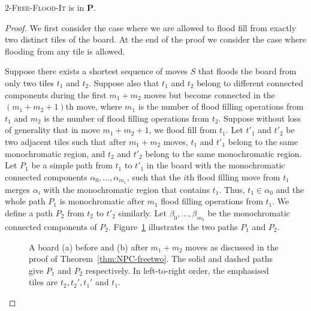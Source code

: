 \documentclass[a4paper,11pt]{llncs}
\newcommand{\pgfgraphic}[1]{}
\newcounter{l}
\newcommand{\Ptime}{\ensuremath{\mathbf{P}}}
\newcommand{\ColoroidFree}[1]{$#1$-\textsc{Free-Flood-It}}
\begin{document}
\begin{theorem}\label{thm:NPC-freetwo}
        \ColoroidFree{2} is in \Ptime.
\end{theorem}
\begin{proof}
    We first consider the case where we are allowed to flood fill from exactly two distinct tiles of the board. At the end of the proof we consider the case where flooding from any tile is allowed.

    Suppose there exists a shortest sequence of moves $S$ that floods the board from only two tiles $t_1$ and $t_2$. Suppose also that $t_1$ and $t_2$ belong to different connected components during the first $m_1+m_2$ moves but become connected in the $(m_1+m_2+1)$th move, where $m_1$ is the number of flood filling operations from $t_1$ and $m_2$ is the number of flood filling operations from $t_2$. Suppose without loss of generality that in move $m_1+m_2+1$, we flood fill from $t_1$. Let $t'_1$ and $t'_2$ be two adjacent tiles such that after $m_1+m_2$ moves, $t_1$ and $t'_1$ belong to the same monochromatic region, and $t_2$ and $t'_2$ belong to the same monochromatic region. Let $P_1$ be a simple path from $t_1$ to $t'_1$ in the board with the monochromatic connected components $\alpha_0,\dots,\alpha_{m_1}$, such that the $i$th flood filling move from $t_1$ merges $\alpha_i$ with the monochromatic region that contains $t_1$. Thus, $t_1\in \alpha_0$ and the whole path $P_1$ is monochromatic after $m_1$ flood filling operations from $t_1$. We define a path $P_2$ from $t_2$ to $t'_2$ similarly. Let $\beta_0,\dots,\beta_{m_2}$ be the monochromatic connected components of $P_2$. Figure~\ref{fig:NPC-2freeA} illustrates the two paths $P_1$ and $P_2$.
\begin{figure}[t]
        \centering
	\pgfgraphic{graphic-2freeA}
        \caption{ A board (a) before and (b) after $m_1+m_2$ moves as discussed in the proof of Theorem~\ref{thm:NPC-freetwo}. The solid and dashed paths give $P_1$ and $P_2$ respectively. In left-to-right order, the emphasised tiles are $t_2,t_2',t_1'$ and $t_1$.}
    \label{fig:NPC-2freeA}
    \end{figure}


\end{proof}
\end{document}
